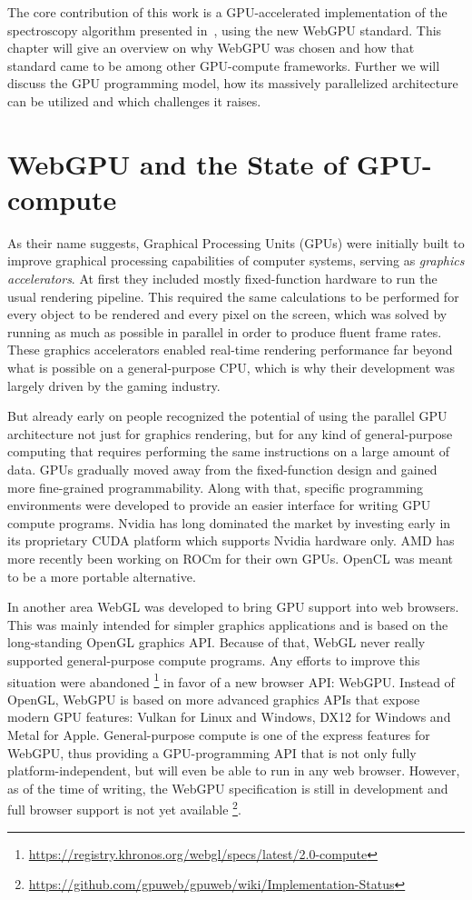 The core contribution of this work is a GPU-accelerated implementation of the
spectroscopy algorithm presented in~\cite{bisping2023process},
using the new WebGPU standard.
This chapter will give an overview on why WebGPU was chosen and how that
standard came to be among other GPU-compute frameworks.
Further we will discuss the GPU programming model,
how its massively parallelized architecture can be utilized
and which challenges it raises.

\section{WebGPU and the State of GPU-compute}

As their name suggests, Graphical Processing Units (GPUs) were initially built
to improve graphical processing capabilities of computer systems,
serving as \emph{graphics accelerators}.
At first they included mostly fixed-function hardware to run the usual
rendering pipeline.
This required the same calculations to be performed for every object to
be rendered and every pixel on the screen,
which was solved by running as much as possible in parallel in order to produce
fluent frame rates.
These graphics accelerators enabled real-time rendering performance far beyond
what is possible on a general-purpose CPU,
which is why their development was largely driven by the gaming industry.

But already early on people recognized the potential of using the parallel
GPU architecture not just for graphics rendering,
but for any kind of general-purpose computing that requires performing the same
instructions on a large amount of data.
GPUs gradually moved away from the fixed-function design and gained more
fine-grained programmability.
Along with that, specific programming environments were
developed to provide an easier interface for writing GPU compute programs.
Nvidia has long dominated the market by investing early in its
proprietary CUDA platform which supports Nvidia hardware only.
AMD has more recently been working on ROCm for their own GPUs.
OpenCL was meant to be a more portable alternative.

In another area WebGL was developed to bring GPU support into web browsers.
This was mainly intended for simpler graphics applications and is based on the
long-standing OpenGL graphics API\@.
Because of that, WebGL never really supported general-purpose compute programs.
Any efforts to improve this situation were abandoned%
\footnote{\url{https://registry.khronos.org/webgl/specs/latest/2.0-compute}}
in favor of a new browser API\@: WebGPU\@.
Instead of OpenGL, WebGPU is based on more advanced graphics APIs
that expose modern GPU features:
Vulkan for Linux and Windows, DX12 for Windows and Metal for Apple.
General-purpose compute is one of the express features for WebGPU,
thus providing a GPU-programming API that is not only fully
platform-independent, but will even be able to run in any web browser.
However, as of the time of writing, the WebGPU specification is still in
development and full browser support is not yet available%
\footnote{\url{https://github.com/gpuweb/gpuweb/wiki/Implementation-Status}}.

